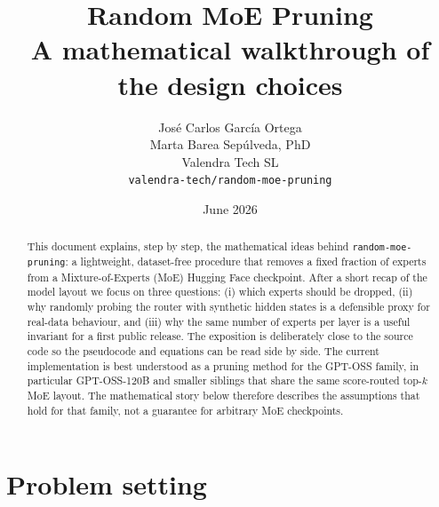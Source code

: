 \documentclass[11pt,a4paper]{article}
\title{\textbf{Random MoE Pruning}\\[0.3em]
       \large A mathematical walkthrough of the design choices}
\author{José Carlos García Ortega\\
  Marta Barea Sepúlveda, PhD\\
  \small Valendra Tech SL\\
        \small\texttt{valendra-tech/random-moe-pruning}}
\date{June 2026}
\newcommand{\1}{\mathbf{1}}
\theoremstyle{plain}
\begin{document}
\maketitle

\begin{abstract}
\noindent
This document explains, step by step, the mathematical ideas behind
\texttt{random-moe-pruning}: a lightweight, dataset-free procedure that
removes a fixed fraction of experts from a Mixture-of-Experts (MoE)
Hugging Face checkpoint.  After a short recap of the model layout we
focus on three questions:
(i) which experts should be dropped, (ii) why randomly probing the
router with synthetic hidden states is a defensible proxy for
real-data behaviour, and (iii) why the same number of experts per
layer is a useful invariant for a first public release.
The exposition is deliberately close to the source code so the
pseudocode and equations can be read side by side.
The current implementation is best understood as a pruning method for
the GPT-OSS family, in particular GPT-OSS-120B and smaller siblings
that share the same score-routed top-$k$ MoE layout.  The mathematical
story below therefore describes the assumptions that hold for that
family, not a guarantee for arbitrary MoE checkpoints.
\end{abstract}

\tableofcontents
\bigskip

\section{Problem setting}
\end{document}
